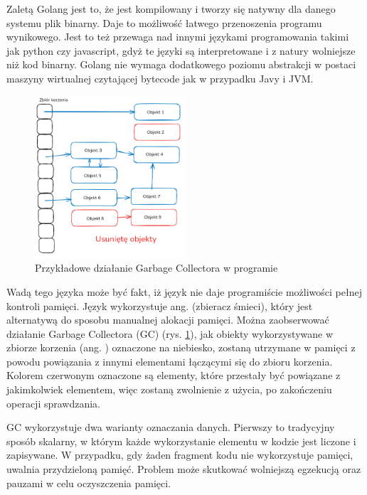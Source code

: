 Zaletą Golang jest to, że jest kompilowany i tworzy się natywny dla danego 
systemu plik binarny. Daje to możliwość łatwego przenoszenia programu wynikowego.
Jest to też przewaga nad innymi językami programowania takimi jak python czy
javascript, gdyż te języki są interpretowane i z natury wolniejsze niż kod 
binarny. Golang nie wymaga dodatkowego poziomu abstrakcji w postaci maszyny 
wirtualnej czytającej bytecode jak w przypadku Javy i JVM.

\begin{figure}[htbp]
    \centering
    \includegraphics[width=0.5\textwidth]{./images/GarbageCollector.png}
    \caption{Przykładowe działanie Garbage Collectora w programie}
    \label{fig:GarbageCollectorImage}
\end{figure}

Wadą tego języka może być fakt, iż język nie daje programiście możliwości pełnej
kontroli pamięci. Język wykorzystuje ang.  (zbieracz 
śmieci), który jest alternatywą do sposobu manualnej alokacji pamięci. Można 
zaobserwować działanie Garbage Collectora (GC) (rys. \ref{fig:GarbageCollectorImage}),
jak obiekty wykorzystywane w zbiorze korzenia (ang. ) oznaczone na 
niebiesko, zostaną utrzymane w pamięci z powodu powiązania z innymi elementami
łączącymi się do zbioru korzenia. Kolorem czerwonym oznaczone są elementy, które
przestały być powiązane z jakimkolwiek elementem, więc zostaną zwolnienie z 
użycia, po zakończeniu operacji sprawdzania. 

GC wykorzystuje dwa warianty oznaczania danych. Pierwszy to tradycyjny sposób
skalarny, w którym każde wykorzystanie elementu w kodzie jest liczone i
zapisywane. W przypadku, gdy żaden fragment kodu nie wykorzystuje pamięci,
 uwalnia przydzieloną pamięć. Problem może skutkować
 wolniejszą egzekucją oraz pauzami w celu oczyszczenia pamięci.

